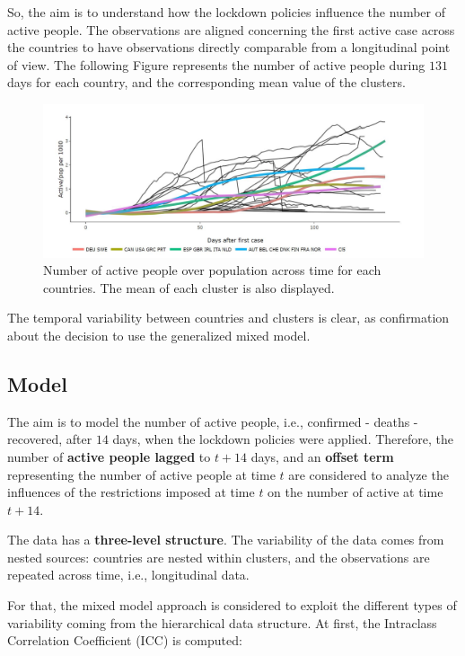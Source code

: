 \documentclass[
  6pt,
]{article}
\begin{document}
So, the aim is to understand how the lockdown policies influence the
number of active people. The observations are aligned concerning the
first active case across the countries to have observations directly
comparable from a longitudinal point of view. The following Figure
represents the number of active people during \(131\) days for each
country, and the corresponding mean value of the clusters.

\begin{figure}
\centering
\includegraphics[width=\textwidth]{Report_SC_Group3_files/figure-latex/fig5.jpg}
\caption{\label{fig:figsA1} Number of active people over population
across time for each countries. The mean of each cluster is also
displayed.}
\end{figure}

The temporal variability between countries and clusters is clear, as
confirmation about the decision to use the generalized mixed model.

\hypertarget{model}{%
\subsection{Model}\label{model}}

The aim is to model the number of active people, i.e., confirmed -
deaths - recovered, after \(14\) days, when the lockdown policies were
applied. Therefore, the number of \textbf{active people lagged} to
\(t+14\) days, and an \textbf{offset term} representing the number of
active people at time \(t\) are considered to analyze the influences of
the restrictions imposed at time \(t\) on the number of active at time
\(t+14\).

The data has a \textbf{three-level structure}. The variability of the
data comes from nested sources: countries are nested within clusters,
and the observations are repeated across time, i.e., longitudinal data.

For that, the mixed model approach is considered to exploit the
different types of variability coming from the hierarchical data
structure. At first, the Intraclass Correlation Coefficient (ICC) is
computed:
\end{document}
